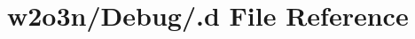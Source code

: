\hypertarget{w2o3n_2_debug_2_8d}{}\section{w2o3n/\+Debug/.d File Reference}
\label{w2o3n_2_debug_2_8d}
